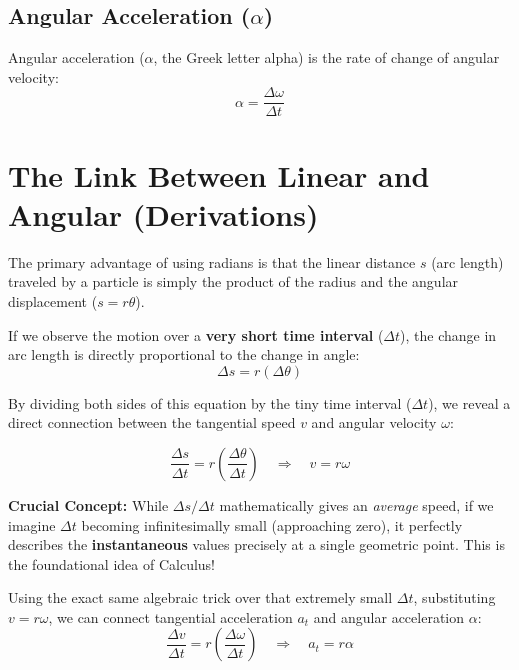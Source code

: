 \documentclass{article}
\begin{document}
\subsection{Angular Acceleration ($\alpha$)}
Angular acceleration ($\alpha$, the Greek letter alpha) is the rate of change of angular velocity:
\begin{equation}
  \alpha = \frac{\Delta \omega}{\Delta t}
\end{equation}

\section{The Link Between Linear and Angular (Derivations)}

The primary advantage of using radians is that the linear distance $s$ (arc length) traveled by a particle is simply the product of the radius and the angular displacement ($s=r\theta$). 

If we observe the motion over a \textbf{very short time interval} ($\Delta t$), the change in arc length is directly proportional to the change in angle:
\begin{equation*}
    \Delta s = r (\Delta \theta)
\end{equation*}

By dividing both sides of this equation by the tiny time interval ($\Delta t$), we reveal a direct connection between the tangential speed $v$ and angular velocity $\omega$:

\begin{equation}
    \frac{\Delta s}{\Delta t} = r \left( \frac{\Delta \theta}{\Delta t} \right) \quad \Rightarrow \quad v = r\omega
\end{equation}

\textbf{Crucial Concept:} While $\Delta s / \Delta t$ mathematically gives an \emph{average} speed, if we imagine $\Delta t$ becoming infinitesimally small (approaching zero), it perfectly describes the \textbf{instantaneous} values precisely at a single geometric point. This is the foundational idea of Calculus!

Using the exact same algebraic trick over that extremely small $\Delta t$, substituting $v = r\omega$, we can connect tangential acceleration $a_t$ and angular acceleration $\alpha$:
\begin{equation}
    \frac{\Delta v}{\Delta t} = r \left( \frac{\Delta \omega}{\Delta t} \right) \quad \Rightarrow \quad a_t = r\alpha
\end{equation}
\end{document}
